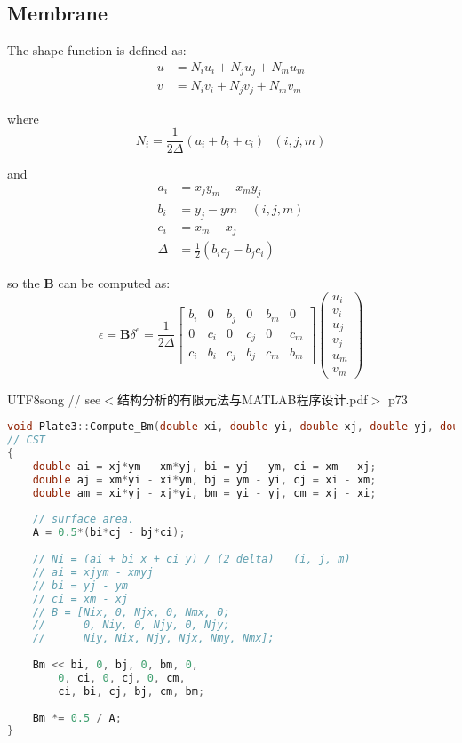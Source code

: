\subsection{Membrane}
The shape function is defined as:
\begin{equation}
\begin{split}
u &= N_i u_i + N_j u_j + N_m u_m \\
v &= N_i v_i + N_j v_j +N_m v_m
\end{split}
\end{equation}

where 
\begin{equation}\label{key}
N_i = \frac{1}{2\Delta} ( a_i + b_i+c_i ) ~~~ (i,j,m)
\end{equation}

and
\begin{equation}\label{key}
\begin{split}
a_i &= x_j y_m-x_m y_j \\
b_i &= y_j - ym ~~~~~(i,j,m)\\
c_i &= x_m-x_j \\
\Delta &= \frac{1}{2} (b_i c_j - b_j c_i)
\end{split}
\end{equation}

so the $ \mathbf{B} $ can be computed as:
\begin{equation}\label{key}
\epsilon = \mathbf{B} \delta^e = \frac{1}{2\Delta} \begin{bmatrix}
b_i & 0 & b_j & 0 & b_m & 0 \\ 
0 & c_i & 0 & c_j & 0 & c_m \\ 
c_i & b_i & c_j & b_j & c_m & b_m
\end{bmatrix} \begin{pmatrix}
u_i \\ 
v_i \\ 
u_j \\ 
v_j \\ 
u_m \\ 
v_m
\end{pmatrix} 
\end{equation}

\begin{CJK*}{UTF8}{song}
// see$ < $结构分析的有限元法与MATLAB程序设计.pdf$ > $ p73
\end{CJK*}
\begin{lstlisting}[language=c++]
void Plate3::Compute_Bm(double xi, double yi, double xj, double yj, double xm, double ym, double &A, Eigen::Matrix<double,3,6> &Bm)
// CST
{
	double ai = xj*ym - xm*yj, bi = yj - ym, ci = xm - xj;
	double aj = xm*yi - xi*ym, bj = ym - yi, cj = xi - xm;
	double am = xi*yj - xj*yi, bm = yi - yj, cm = xj - xi;
	
	// surface area.
	A = 0.5*(bi*cj - bj*ci);
	
	// Ni = (ai + bi x + ci y) / (2 delta)   (i, j, m)
	// ai = xjym - xmyj
	// bi = yj - ym
	// ci = xm - xj
	// B = [Nix, 0, Njx, 0, Nmx, 0;
	//		0, Niy, 0, Njy, 0, Njy;
	//		Niy, Nix, Njy, Njx, Nmy, Nmx];
	
	Bm << bi, 0, bj, 0, bm, 0,
		0, ci, 0, cj, 0, cm,
		ci, bi, cj, bj, cm, bm;
		
	Bm *= 0.5 / A;
}
\end{lstlisting}

